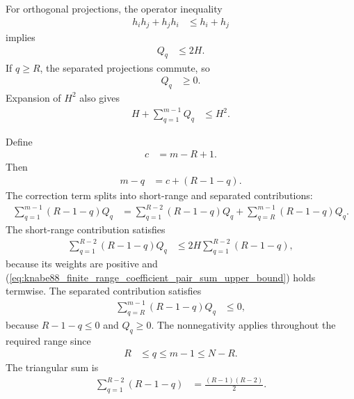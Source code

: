 \documentclass{article}
\begin{document}
For orthogonal projections, the operator inequality
\begin{align}
    h_i h_j+h_j h_i
        &\leq h_i+h_j
    \label{eq:knabe88_finite_range_coefficient_projection_pair_bound}
\end{align}
implies
\begin{align}
    Q_q
        &\leq2H.
    \label{eq:knabe88_finite_range_coefficient_pair_sum_upper_bound}
\end{align}
If $q\geq R$, the separated projections commute, so
\begin{align}
    Q_q
        &\geq0.
    \label{eq:knabe88_finite_range_coefficient_pair_sum_nonnegative}
\end{align}
Expansion of $H^2$ also gives
\begin{align}
    H+\sum_{q=1}^{m-1}Q_q
        &\leq H^2.
    \label{eq:knabe88_finite_range_coefficient_hamiltonian_square_lower_bound}
\end{align}

Define
\begin{align}
    c
        &=m-R+1.
    \label{eq:knabe88_finite_range_coefficient_baseline_coefficient}
\end{align}
Then
\begin{align}
    m-q
        &=c+(R-1-q).
    \label{eq:knabe88_finite_range_coefficient_weight_decomposition}
\end{align}
The correction term splits into short-range and separated contributions:
\begin{align}
    \sum_{q=1}^{m-1}(R-1-q)Q_q
        &=\sum_{q=1}^{R-2}(R-1-q)Q_q
          +\sum_{q=R}^{m-1}(R-1-q)Q_q.
    \label{eq:knabe88_finite_range_coefficient_correction_split}
\end{align}
The short-range contribution satisfies
\begin{align}
    \sum_{q=1}^{R-2}(R-1-q)Q_q
        &\leq
          2H\sum_{q=1}^{R-2}(R-1-q),
    \label{eq:knabe88_finite_range_coefficient_short_range_bound}
\end{align}
because its weights are positive and
(\ref{eq:knabe88_finite_range_coefficient_pair_sum_upper_bound}) holds
termwise. The separated contribution satisfies
\begin{align}
    \sum_{q=R}^{m-1}(R-1-q)Q_q
        &\leq0,
    \label{eq:knabe88_finite_range_coefficient_separated_bound}
\end{align}
because $R-1-q\leq0$ and $Q_q\geq0$. The nonnegativity applies throughout
the required range since
\begin{align}
    R
        &\leq q\leq m-1\leq N-R.
    \label{eq:knabe88_finite_range_coefficient_separation_range}
\end{align}
The triangular sum is
\begin{align}
    \sum_{q=1}^{R-2}(R-1-q)
        &=\frac{(R-1)(R-2)}{2}.
    \label{eq:knabe88_finite_range_coefficient_triangular_sum}
\end{align}
\end{document}
